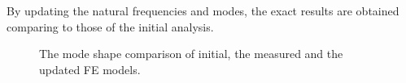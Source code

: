By updating the natural frequencies and modes, the exact results are obtained comparing to those of the initial analysis.

\begin{figure}[!ht]
\centering
{}
\caption{The mode shape comparison of initial, the measured and the updated FE models.}
\label{fig:7-6}
\end{figure}


